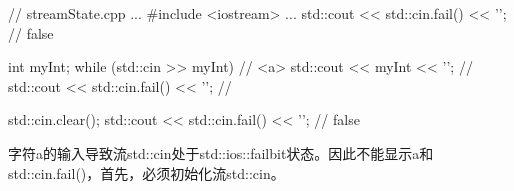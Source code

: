 
\begin{cpp}
// streamState.cpp
...
#include <iostream>
...
std::cout << std::cin.fail() << '\n'; // false

int myInt;
while (std::cin >> myInt){ // <a>
	std::cout << myInt << '\n'; //
	std::cout << std::cin.fail() << '\n'; //
}

std::cin.clear();
std::cout << std::cin.fail() << '\n'; // false
\end{cpp}

字符a的输入导致流std::cin处于std::ios::failbit状态。因此不能显示a和std::cin.fail()，首先，必须初始化流std::cin。































